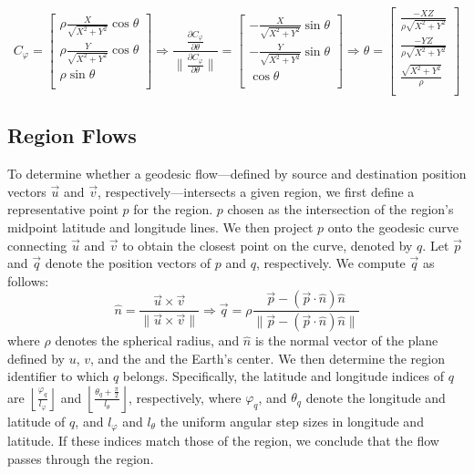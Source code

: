 \documentclass[acmsmall, screen]{acmart}
\begin{document}
\begin{equation}\label{appendix:geomCalc:latlon:lat}
    C_{\varphi} = 
    \begin{bmatrix}
    \rho \frac{X}{\sqrt{X^2+Y^2}} \cos{\theta} \\
    \rho \frac{Y}{\sqrt{X^2+Y^2}} \cos{\theta} \\
    \rho \sin{\theta} \\
    \end{bmatrix} \Longrightarrow
    \frac{\frac{\partial C_{\varphi}}{\partial \theta}}{\|\frac{\partial C_{\varphi}}{\partial \theta}\|} = 
    \begin{bmatrix}
    - \frac{X}{\sqrt{X^2+Y^2}} \sin{\theta} \\
    - \frac{Y}{\sqrt{X^2+Y^2}} \sin{\theta} \\
    \cos{\theta} \\
    \end{bmatrix} \Longrightarrow \hat{\theta} = 
    \begin{bmatrix}
    \frac{-XZ}{\rho \sqrt{X^2+Y^2}} \\
    \frac{-YZ}{\rho \sqrt{X^2+Y^2}} \\
    \frac{\sqrt{X^2+Y^2}}{\rho} \\
    \end{bmatrix}
\end{equation}

\subsection{Region Flows}\label{appendix:geomCalc:geodesicRegion}
To determine whether a geodesic flow—defined by source and destination position vectors $\vec{u}$ and $\vec{v}$, respectively—intersects a given region, we first define a representative point $p$ for the region. $p$ chosen as the intersection of the region’s midpoint latitude and longitude lines. We then project $p$ onto the geodesic curve connecting $\vec{u}$ and $\vec{v}$ to obtain the closest point on the curve, denoted by $q$. Let $\vec{p}$ and $\vec{q}$ denote the position vectors of $p$ and $q$, respectively. We compute $\vec{q}$ as follows:
\begin{equation}\label{appendix:geomCalc:geodesicRegion:projection}
    \hat{n} = \frac{\vec{u} \times \vec{v}}{\|\vec{u} \times \vec{v}\|} \Longrightarrow \vec{q} = \rho \frac{\vec{p}-(\vec{p} \cdot \hat{n})\hat{n}}{\|\vec{p}-(\vec{p} \cdot \hat{n})\hat{n}\|}
\end{equation}
where $\rho$ denotes the spherical radius, and $\hat{n}$ is the normal vector of the plane defined by $u$, $v$, and the and the Earth’s center. We then determine the region identifier to which $q$ belongs. Specifically, the latitude and longitude indices of $q$ are $\left\lfloor \frac{\varphi_q}{l_\varphi} \right\rfloor$ and $\left\lfloor \frac{\theta_q+\frac{\pi}{2}}{l_\theta} \right\rfloor$, respectively, where $\varphi_q$, and $\theta_q$ denote the longitude and latitude of $q$, and $l_\varphi$ and $l_\theta$ the uniform angular step sizes in longitude and latitude. If these indices match those of the region, we conclude that the flow passes through the region.
\end{document}
